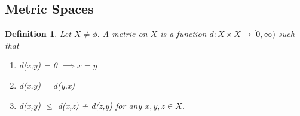 \documentclass[12pt]{report}
\newtheorem{defn}{Definition}
\begin{document}
\subsection*{Metric Spaces}
\begin{defn}
    Let $X \neq \phi$. A metric on $X$ is a function $d:X \times X \to [0, \infty)$ such that 
    \begin{enumerate}
        \item d(x,y) = 0 $\implies x = y$
        \item d(x,y) = d(y,x)
        \item d(x,y) $\leq$ d(x,z) + d(z,y) for any $x,y,z \in X$.
    \end{enumerate}
\end{defn}
\end{document}
